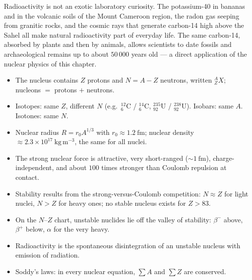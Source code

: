 \documentclass[11pt]{article}
\begin{document}
\begin{savaistu}
Radioactivity is not an exotic laboratory curiosity. The potassium-40 in bananas and in the volcanic soils of the Mount Cameroon region, the radon gas seeping from granitic rocks, and the cosmic rays that generate carbon-14 high above the Sahel all make natural radioactivity part of everyday life. The same carbon-14, absorbed by plants and then by animals, allows scientists to date fossils and archaeological remains up to about $50\,000$ years old --- a direct application of the nuclear physics of this chapter.
\end{savaistu}

\begin{aretenir}
\begin{itemize}
\item The nucleus contains $Z$ protons and $N = A - Z$ neutrons, written ${}^{A}_{Z}X$; nucleons $=$ protons $+$ neutrons.
\item Isotopes: same $Z$, different $N$ (e.g.\ $\ensuremath{\mathrm{^{12}_{6}C}}$ / $\ensuremath{\mathrm{^{14}_{6}C}}$, $\ensuremath{\mathrm{^{235}_{92}U}}$ / $\ensuremath{\mathrm{^{238}_{92}U}}$). Isobars: same $A$. Isotones: same $N$.
\item Nuclear radius $R = r_0 A^{1/3}$ with $r_0 \approx 1.2\ \mathrm{fm}$; nuclear density $\approx 2.3\times 10^{17}\ \mathrm{kg\,m^{-3}}$, the same for all nuclei.
\item The strong nuclear force is attractive, very short-ranged ($\sim 1\ \mathrm{fm}$), charge-independent, and about $100$ times stronger than Coulomb repulsion at contact.
\item Stability results from the strong-versus-Coulomb competition: $N \approx Z$ for light nuclei, $N > Z$ for heavy ones; no stable nucleus exists for $Z > 83$.
\item On the $N$--$Z$ chart, unstable nuclides lie off the valley of stability: $\beta^{-}$ above, $\beta^{+}$ below, $\alpha$ for the very heavy.
\item Radioactivity is the spontaneous disintegration of an unstable nucleus with emission of radiation.
\item Soddy's laws: in every nuclear equation, $\sum A$ and $\sum Z$ are conserved.
\end{itemize}
\end{aretenir}
\end{document}
